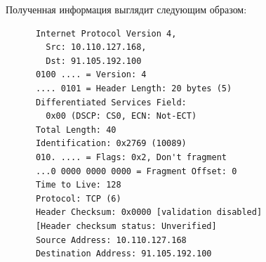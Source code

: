\documentclass[a4paper]{article}
\begin{document}
  Полученная информация выглядит следующим образом:
  \begin{listing}[H]
    \begin{verbatim}
      Internet Protocol Version 4,
        Src: 10.110.127.168,
        Dst: 91.105.192.100
      0100 .... = Version: 4
      .... 0101 = Header Length: 20 bytes (5)
      Differentiated Services Field:
        0x00 (DSCP: CS0, ECN: Not-ECT)
      Total Length: 40
      Identification: 0x2769 (10089)
      010. .... = Flags: 0x2, Don't fragment
      ...0 0000 0000 0000 = Fragment Offset: 0
      Time to Live: 128
      Protocol: TCP (6)
      Header Checksum: 0x0000 [validation disabled]
      [Header checksum status: Unverified]
      Source Address: 10.110.127.168
      Destination Address: 91.105.192.100
    \end{verbatim}
  \end{listing}
\end{document}
